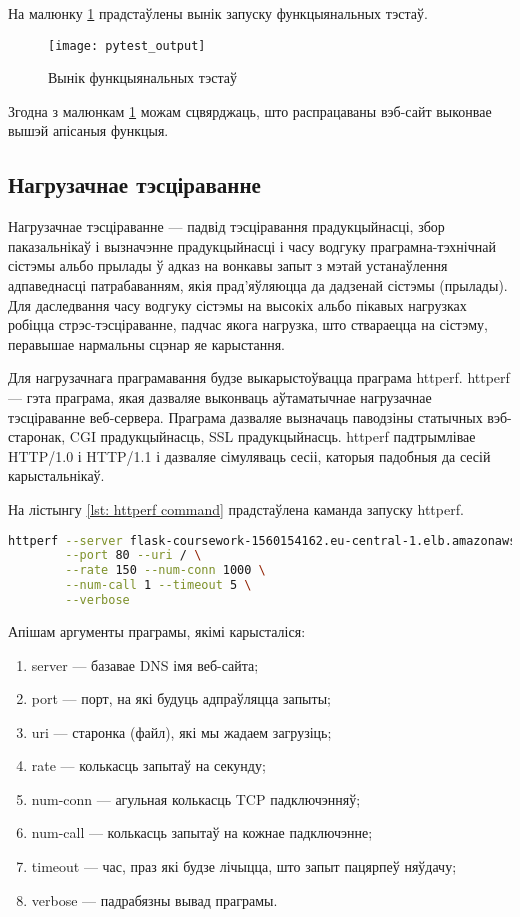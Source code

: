 На малюнку \ref{img: pytest output} прадстаўлены вынік запуску функцыянальных тэстаў.
\begin{figure}[h!]
    \centering
    \texttt{[image: pytest\_output]}
    \caption{Вынік функцыянальных тэстаў}
    \label{img: pytest output} 
\end{figure}

Згодна з малюнкам \ref{img: pytest output} можам сцвярджаць, што распрацаваны вэб-сайт
выконвае вышэй апісаныя функцыя.

\subsection{Нагрузачнае тэсціраванне}

Нагрузачнае тэсціраванне --- падвід тэсціравання прадукцыйнасці, збор паказальнікаў і вызначэнне
прадукцыйнасці і часу водгуку праграмна-тэхнічнай сістэмы альбо прылады ў адказ на вонкавы запыт
з мэтай устанаўлення адпаведнасці патрабаванням, якія прад'яўляюцца да дадзенай сістэмы (прылады).
Для даследвання часу водгуку сістэмы на высокіх альбо пікавых нагрузках робіцца стрэс-тэсціраванне,
падчас якога нагрузка, што ствараецца на сістэму, перавышае нармальны сцэнар яе карыстання.

Для нагрузачнага праграмавання будзе выкарыстоўвацца праграма httperf.
httperf --- гэта праграма, якая дазваляе выконваць аўтаматычнае нагрузачнае тэсціраванне веб-сервера.
Праграма дазваляе вызначаць паводзіны статычных вэб-старонак, CGI прадукцыйнасць, SSL прадукцыйнасць.
httperf падтрымлівае HTTP/1.0 і HTTP/1.1 і дазваляе сімуляваць сесіі, каторыя падобныя да сесій карыстальнікаў.

На лістынгу \ref{lst: httperf command} прадстаўлена каманда запуску httperf.

\begin{lstlisting}[language=bash,caption={Каманда запуску праграмы httperf},label={lst: httperf command}]
httperf --server flask-coursework-1560154162.eu-central-1.elb.amazonaws.com \
        --port 80 --uri / \
        --rate 150 --num-conn 1000 \
        --num-call 1 --timeout 5 \
        --verbose
\end{lstlisting}

Апішам аргументы праграмы, якімі карысталіся:
\begin{enumerate}
    \item server --- базавае DNS імя веб-сайта;
    \item port --- порт, на які будуць адпраўляцца запыты;
    \item uri --- старонка (файл), які мы жадаем загрузіць;
    \item rate --- колькасць запытаў на секунду;
    \item num-conn --- агульная колькасць TCP падключэнняў;
    \item num-call --- колькасць запытаў на кожнае падключэнне;
    \item timeout --- час, праз які будзе лічыцца, што запыт пацярпеў няўдачу;
    \item verbose --- падрабязны вывад праграмы.
\end{enumerate}

